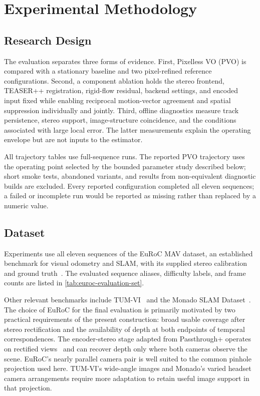 
\chapter{Experimental Methodology}\label{chapter:experimental-methodology}

\section{Research Design}

The evaluation separates three forms of evidence. First, Pixelless VO (PVO) is
compared with a stationary baseline and two pixel-refined reference
configurations. Second, a component ablation holds the stereo frontend,
TEASER++ registration, rigid-flow residual, backend settings, and encoded input
fixed while enabling reciprocal motion-vector agreement and spatial suppression
individually and jointly. Third, offline diagnostics measure track persistence,
stereo support, image-structure coincidence, and the conditions associated with
large local error. The latter measurements explain the operating envelope but
are not inputs to the estimator.

All trajectory tables use full-sequence runs. The reported PVO trajectory uses
the operating point selected by the bounded parameter study described below;
short smoke tests, abandoned variants, and results from non-equivalent
diagnostic builds are excluded. Every reported configuration completed
all eleven sequences; a failed or incomplete run would be reported as missing
rather than replaced by a numeric value.

\section{Dataset}

Experiments use all eleven sequences of the EuRoC MAV dataset, an established
benchmark for visual odometry and SLAM, with its supplied stereo calibration
and ground truth~\cite{burri2016euroc}. The evaluated sequence
aliases, difficulty labels, and frame counts are listed in
\autoref{tab:euroc-evaluation-set}.

Other relevant benchmarks include TUM-VI~\cite{schubert2018vidataset} and the
Monado SLAM Dataset~\cite{deMayoCremersPireMSD}. The choice of EuRoC for the
final evaluation is primarily motivated by two practical requirements of the
present construction: broad usable coverage after stereo rectification and
the availability of depth at both endpoints of temporal correspondences.
The encoder-stereo stage adapted from Passthrough+ operates on rectified
views~\cite{chaurasia2020passthrough} and can recover depth only where both
cameras observe the scene. EuRoC's nearly parallel camera pair is well suited
to the common pinhole projection used here. TUM-VI's wide-angle images and
Monado's varied headset camera arrangements require more adaptation to retain
useful image support in that projection.

